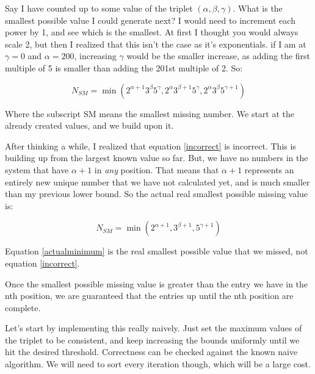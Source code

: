 \documentclass{article}
\begin{document}
Say I have counted up to some value of the triplet $(\alpha, \beta, \gamma)$. What is the smallest possible value I could generate next? I would need to increment each power by 1, and see which is the smallest. At first I thought you would always scale 2, but then I realized that this isn't the case as it's exponentials. if I am at $\gamma = 0$ and $\alpha = 200$, increasing $\gamma$ would be the smaller increase, as adding the first multiple of 5 is smaller than adding the 201st multiple of 2. So:

\begin{equation}
    N_{SM} = \min(2^{\alpha + 1}3^{\beta}5^{\gamma}, 2^{\alpha}3^{\beta + 1}5^{\gamma}, 2^{\alpha}3^{\beta}5^{\gamma + 1})
    \label{incorrect}
\end{equation}

Where the subscript SM means the smallest missing number. We start at the already created values, and we build upon it. \newline

After thinking a while, I realized that equation \ref{incorrect} is incorrect. This is building up from the largest known value so far. But, we have no numbers in the system that have $\alpha + 1$ in \textit{any} position. That means that $\alpha + 1$ represents an entirely new unique number that we have not calculated yet, and is much smaller than my previous lower bound. So the actual real smallest possible missing value is:

\begin{equation}
    N_{SM} = \min(2^{\alpha + 1}, 3^{\beta + 1}, 5^{\gamma + 1})
    \label{actualminimum}
\end{equation}

Equation \ref{actualminimum} is the real smallest possible value that we missed, not equation \ref{incorrect}. \newline

Once the smallest possible missing value is greater than the entry we have in the nth position, we are guaranteed that the entries up until the nth position are complete. \newline

Let's start by implementing this really naively. Just set the maximum values of the triplet to be consistent, and keep increasing the bounds uniformly until we hit the desired threshold. Correctness can be checked against the known naive algorithm. We will need to sort every iteration though, which will be a large cost. \newline
\end{document}
